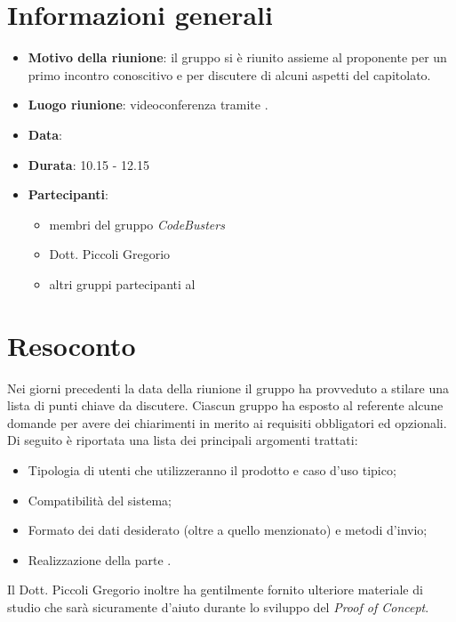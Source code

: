 \section{Informazioni generali}
\begin{itemize}
\item \textbf{Motivo della riunione}: il gruppo si è riunito assieme al proponente per un primo incontro conoscitivo e per discutere di alcuni aspetti del capitolato.
\item \textbf{Luogo riunione}: videoconferenza tramite .
\item \textbf{Data}: \Data{}
\item \textbf{Durata}: 10.15 - 12.15
\item \textbf{Partecipanti}:
	\begin{itemize}
	\item membri del gruppo \textit{CodeBusters}
	\item Dott. Piccoli Gregorio
	\item altri gruppi partecipanti al 
	\end{itemize}
\end{itemize}

\section{Resoconto}
Nei giorni precedenti la data della riunione il gruppo ha provveduto a stilare una lista di punti chiave da discutere. Ciascun gruppo ha esposto al referente alcune domande per avere dei chiarimenti in merito ai requisiti obbligatori ed opzionali. Di seguito è riportata una lista dei principali argomenti trattati:
\begin{itemize}

\item Tipologia di utenti che utilizzeranno il prodotto e caso d'uso tipico;

\item Compatibilità del sistema;

\item Formato dei dati desiderato (oltre a quello menzionato) e metodi d'invio;

\item Realizzazione della parte .

\end{itemize}

Il Dott. Piccoli Gregorio inoltre ha gentilmente fornito ulteriore materiale di studio che sarà sicuramente d'aiuto durante lo sviluppo del \textit{Proof of Concept}.